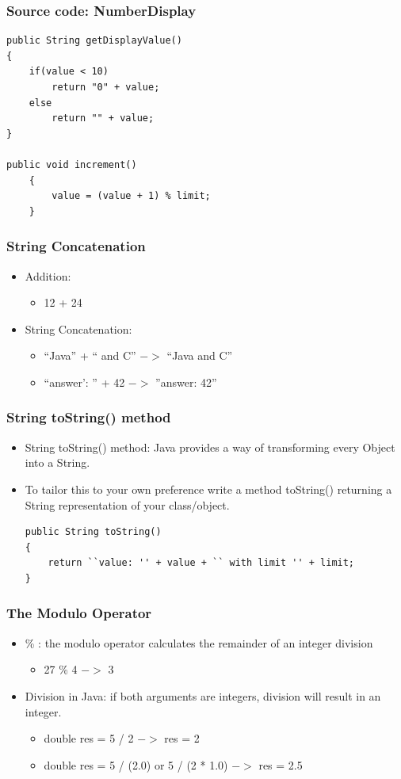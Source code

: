 \documentclass{beamer}
\begin{document}
\begin{frame}[fragile]
\frametitle{Source code: NumberDisplay}
\begin{lstlisting}
public String getDisplayValue()‏
{
    if(value < 10)‏
        return "0" + value;
    else
        return "" + value;
}

public void increment()‏
    {
        value = (value + 1) % limit;
    }
\end{lstlisting}
\end{frame}

\begin{frame}
\frametitle{String Concatenation}
\begin{itemize}
\item Addition:
\begin{itemize}
\item 12 + 24
\end{itemize}
\item String Concatenation:
\begin{itemize}
\item ``Java'' + `` and C'' $->$ ``Java and C''
\item ``answer': '' + 42 $->$ ''answer: 42''
\end{itemize}
\end{itemize}
\end{frame}

\begin{frame}[fragile]
\frametitle{String toString() method}
\begin{itemize}
\item String toString() method: Java provides a way of transforming every Object into a String. 
\item To tailor this to your own preference write a method toString() returning a String representation of your class/object.
\begin{lstlisting}
public String toString()‏
{
	return ``value: '' + value + `` with limit '' + limit;
}
\end{lstlisting}
\end{itemize}
\end{frame}

\begin{frame}
\frametitle{The Modulo Operator}
\begin{itemize}
\item \% : the modulo operator calculates the remainder of an integer division
\begin{itemize}
\item 27 \% 4 $->$ 3
\end{itemize}
\item Division in Java: if both arguments are integers, division will result in an integer.
\begin{itemize}
\item double res = 5 / 2 $->$ res = 2
\item double res = 5 / (2.0) or 5 / (2 * 1.0)    $->$ res = 2.5
\end{itemize}
\end{itemize}
\end{frame}
\end{document}
